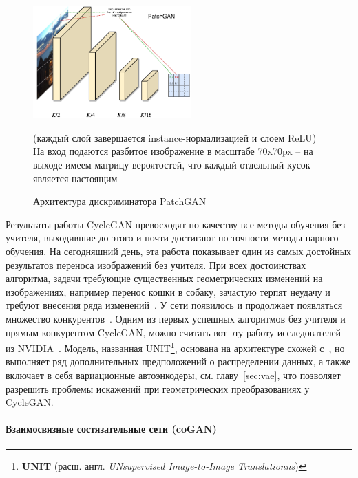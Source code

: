 \documentclass[11pt,a4paper]{extarticle}
\begin{document}
			\begin{figure}[ht]
				\centering
				\includegraphics[width=0.54\textwidth]{img/cyclegan_dis}
				\caption{Архитектура дискриминатора PatchGAN}{
					\small{
						(каждый слой завершается instance-нормализацией и слоем ReLU)\\
						На вход подаются разбитое изображение в масштабе 70x70px -- на выходе имеем матрицу вероятостей, что каждый отдельный кусок является настоящим
					}
				}
				\label{pic:cyclegan_dis}
			\end{figure}
			\noindent
			Результаты работы CycleGAN превосходят по качеству все методы обучения без учителя, выходившие до этого
			и почти достигают по точности методы парного обучения.
			На сегодняшний день, эта работа показывает один из самых достойных результатов переноса изображений без учителя.
			При всех достоинствах алгоритма, задачи требующие существенных геометрических изменений на изображениях, например перенос кошки в собаку, зачастую терпят неудачу и требуют внесения ряда изменений~\cite{CycleGAN}.
			\newline\newline
			У сети появилось и продолжает появляться множество конкурентов~\cite{BicycleGAN,MUNIT,UNIT,DRIT}.
			Одним из первых успешных алгоритмов без учителя и прямым конкурентом CycleGAN, можно считать вот эту работу исследователей из NVIDIA~\cite{UNIT}.
			Модель, названная UNIT\footnote{
				\textbf{UNIT} (расш. англ. \textit{UNsupervised Image-to-Image Translationns})
			}, основана на архитектуре схожей с~\cite{CycleGAN}, но выполняет ряд дополнительных предположений о распределении данных, а также включает в себя
			вариационные автоэнкодеры, см. главу~\ref{sec:vae}, что позволяет разрешить проблемы искажений при геометрических преобразованиях у CycleGAN.
		
		\paragraph{Взаимосвязные состязательные сети (coGAN)}\label{sec:cogan}
\end{document}
